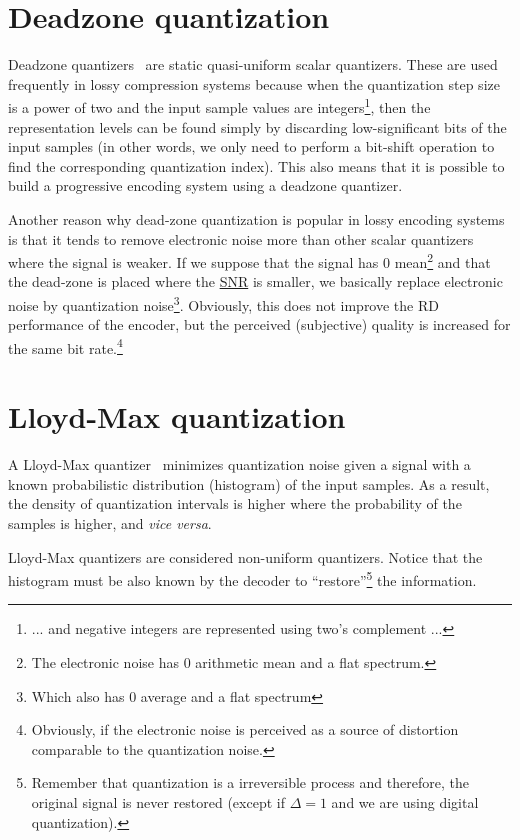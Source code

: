 \section{Deadzone quantization}

Deadzone quantizers~\cite{vruiz__scalar_quantization} are static
quasi-uniform scalar quantizers. These are used frequently in lossy
compression systems because when the quantization step size is a power
of two and the input sample values are integers\footnote{... and negative
integers are represented using two's complement ...}, then the
representation levels can be found simply by discarding
low-significant bits of the input samples (in other words, we only
need to perform a bit-shift operation to find the corresponding
quantization index). This also means that it is possible to build a
progressive encoding system using a deadzone quantizer.

Another reason why dead-zone quantization is popular in lossy encoding
systems is that it tends to remove electronic noise more than other
scalar quantizers where the signal is weaker. If we suppose that the
signal has 0 mean\footnote{The electronic noise has 0 arithmetic mean
  and a flat spectrum.} and that the dead-zone is placed where the
\href{https://en.wikipedia.org/wiki/Signal-to-noise_ratio}{SNR} is
smaller, we basically replace electronic noise by quantization
noise\footnote{Which also has 0 average and a flat
  spectrum}. Obviously, this does not improve the RD performance of
the encoder, but the perceived (subjective) quality is increased for
the same bit rate.\footnote{Obviously, if the electronic noise is
  perceived as a source of distortion comparable to the quantization
  noise.}

\section{Lloyd-Max quantization}

A Lloyd-Max quantizer~\cite{vruiz__scalar_quantization} minimizes
quantization noise given a signal with a known probabilistic
distribution (histogram) of the input samples. As a result, the
density of quantization intervals is higher where the probability of
the samples is higher, and \textit{vice versa}.

Lloyd-Max quantizers are considered non-uniform quantizers. Notice
that the histogram must be also known by the decoder to
``restore''\footnote{Remember that quantization is a irreversible
  process and therefore, the original signal is never restored (except
  if $\Delta=1$ and we are using digital quantization).} the
information.

